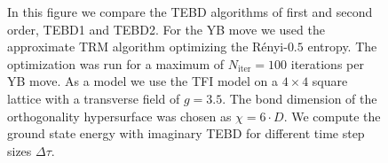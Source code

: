 \begin{figure}
\begin{minipage}{1.0\textwidth}
%
	\end{minipage}
	\caption{In this figure we compare the TEBD algorithms of first and second order, TEBD1 and TEBD2. For the YB move we used the approximate TRM algorithm optimizing the Rényi-$0.5$ entropy. The optimization was run for a maximum of $N_\text{iter} = 100$ iterations per YB move. As a model we use the TFI model on a $4\times4$ square lattice with a transverse field of $g = 3.5$. The bond dimension of the orthogonality hypersurface was chosen as $\chi=6\cdot D$. We compute the ground state energy with imaginary TEBD for different time step sizes $\Delta\tau$.}
	\label{fig:tfi_gs_energy_vs_dtau_TEBD1_vs_TEBD2}
\end{figure}